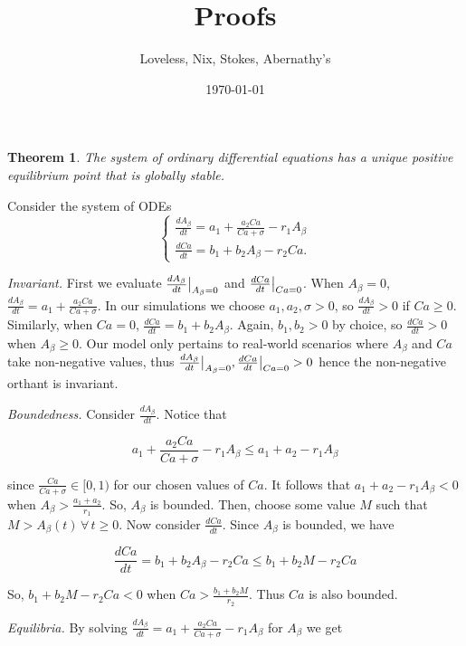 \documentclass[12pt]{article}
\title{Proofs}
\author{Loveless, Nix, Stokes, Abernathy's}
\date{\today}
\newtheorem*{thm}{Theorem}
\theoremstyle{definition}
\begin{document}
\maketitle
\vspace{-2em}  %

\begin{thm}
    The system of ordinary differential equations has a unique positive equilibrium point that is globally stable.
\end{thm} \bigskip

Consider the system of ODEs
\[\begin{cases}
    \frac{d A_{\beta}}{dt} = a_1 + \frac{a_2 Ca}{Ca + \sigma} - r_1 A_{\beta} \\
    \frac{d Ca}{dt} = b_1 + b_2 A_{\beta} - r_2 Ca.
\end{cases}\] \bigskip

\textit{Invariant.} First we evaluate $\frac{d A_{\beta}}{dt} \big{|}_{A_{\beta}=0}$ and $\frac{dCa}{dt} \big{|}_{Ca = 0}$. When $A_{\beta} = 0$, $\frac{d A_{\beta}}{dt} = a_1 + \frac{a_2 Ca}{Ca + \sigma}$. In our simulations we choose $a_1, a_2, \sigma > 0$, so $\frac{d A_{\beta}}{dt} > 0$ if $Ca \geq 0$. Similarly, when $Ca = 0$, $\frac{dCa}{dt} = b_1 + b_2 A_{\beta}$. Again, $b_1, b_2 > 0$ by choice, so $\frac{dCa}{dt} > 0$ when $A_{\beta} \geq 0$. Our model only pertains to real-world scenarios where $A_{\beta}$ and $Ca$ take non-negative values, thus $\frac{d A_{\beta}}{dt} \big{|}_{A_{\beta}=0}, \frac{dCa}{dt} \big{|}_{Ca = 0} > 0$ hence the non-negative orthant is invariant. \bigskip

\textit{Boundedness.} Consider $\frac{d A_{\beta}}{dt}$. Notice that

\[a_1 + \frac{a_2 Ca}{Ca + \sigma} - r_1 A_{\beta} \leq a_1 + a_2 - r_1 A_{\beta}\]

since $\frac{Ca}{Ca + \sigma} \in [0,1)$ for our chosen values of $Ca$. It follows that $a_1 + a_2 - r_1 A_{\beta} < 0$ when $A_{\beta} > \frac{a_1 + a_2}{r_1}$. So, $A_{\beta}$ is bounded. Then, choose some value $M$ such that $M > A_{\beta} (t) \, \forall \, t \geq 0$. Now consider $\frac{dCa}{dt}$. Since $A_{\beta}$ is bounded, we have 

\[\frac{dCa}{dt} = b_1 + b_2 A_{\beta} - r_2 Ca \leq b_1 + b_2 M - r_2 Ca\]

So, $b_1 + b_2 M - r_2 Ca < 0$ when $Ca > \frac{b_1 + b_2 M}{r_2}$. Thus $Ca$ is also bounded. \bigskip

\textit{Equilibria.} By solving $\frac{d A_{\beta}}{dt} = a_1 + \frac{a_2 Ca}{Ca + \sigma} - r_1 A_{\beta}$ for $A_{\beta}$ we get
\end{document}
